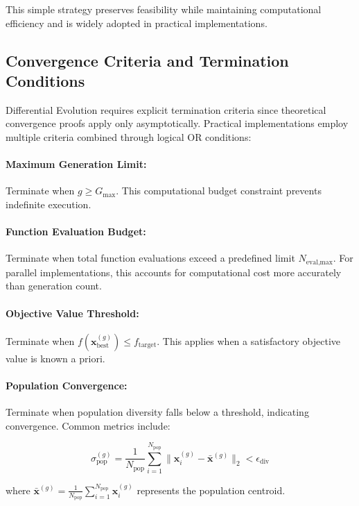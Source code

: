\documentclass[12pt,a4paper]{report}
\begin{document}
This simple strategy preserves feasibility while maintaining computational efficiency and is widely adopted in practical implementations.

\subsection{Convergence Criteria and Termination Conditions}

Differential Evolution requires explicit termination criteria since theoretical convergence proofs apply only asymptotically. Practical implementations employ multiple criteria combined through logical OR conditions:

\paragraph{Maximum Generation Limit:}
Terminate when $g \geq G_{\text{max}}$. This computational budget constraint prevents indefinite execution.

\paragraph{Function Evaluation Budget:}
Terminate when total function evaluations exceed a predefined limit $N_{\text{eval,max}}$. For parallel implementations, this accounts for computational cost more accurately than generation count.

\paragraph{Objective Value Threshold:}
Terminate when $f(\mathbf{x}_{\text{best}}^{(g)}) \leq f_{\text{target}}$. This applies when a satisfactory objective value is known a priori.

\paragraph{Population Convergence:}
Terminate when population diversity falls below a threshold, indicating convergence. Common metrics include:

\begin{equation}
\sigma_{\text{pop}}^{(g)} = \frac{1}{N_{\text{pop}}} \sum_{i=1}^{N_{\text{pop}}} \|\mathbf{x}_i^{(g)} - \bar{\mathbf{x}}^{(g)}\|_2 < \epsilon_{\text{div}}
\end{equation}

where $\bar{\mathbf{x}}^{(g)} = \frac{1}{N_{\text{pop}}} \sum_{i=1}^{N_{\text{pop}}} \mathbf{x}_i^{(g)}$ represents the population centroid.
\end{document}
